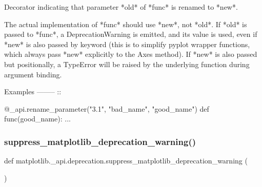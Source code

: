 \begin{DoxyVerb}Decorator indicating that parameter *old* of *func* is renamed to *new*.

The actual implementation of *func* should use *new*, not *old*.  If *old*
is passed to *func*, a DeprecationWarning is emitted, and its value is
used, even if *new* is also passed by keyword (this is to simplify pyplot
wrapper functions, which always pass *new* explicitly to the Axes method).
If *new* is also passed but positionally, a TypeError will be raised by the
underlying function during argument binding.

Examples
--------
::

    @_api.rename_parameter("3.1", "bad_name", "good_name")
    def func(good_name): ...
\end{DoxyVerb}
 \mbox{\label{namespacematplotlib_1_1__api_1_1deprecation_a0ba07ebcb4c5d8a193b7bb41adc2cae1}} 
\subsubsection{\texorpdfstring{suppress\+\_\+matplotlib\+\_\+deprecation\+\_\+warning()}{suppress\_matplotlib\_deprecation\_warning()}}
{\footnotesize\ttfamily def matplotlib.\+\_\+api.\+deprecation.\+suppress\+\_\+matplotlib\+\_\+deprecation\+\_\+warning (\begin{DoxyParamCaption}{ }\end{DoxyParamCaption})}

\mbox{\label{namespacematplotlib_1_1__api_1_1deprecation_a328933cc8e4e030247d96e1fca1a9c8f}} 
